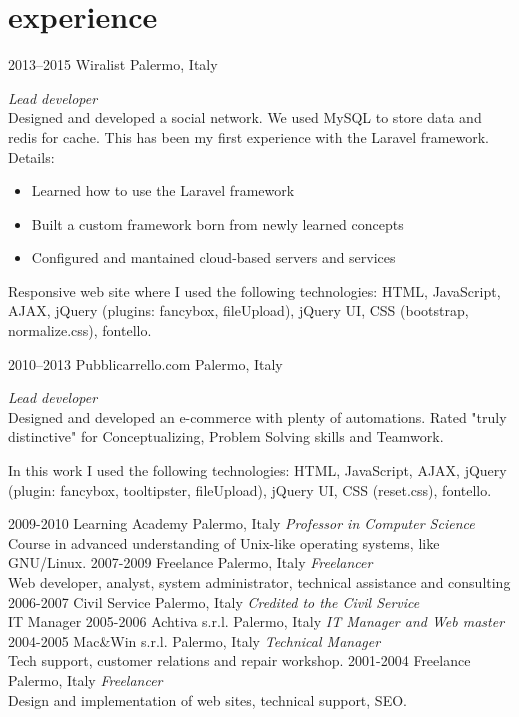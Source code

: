 \documentclass[]{friggeri-cv} %
\begin{document}
\section{experience}
\begin{entrylist}
\entry
{2013--2015}
{Wiralist}
{Palermo, Italy}
{\emph{Lead developer} \\
Designed and developed a social network. We used MySQL to store data and redis for cache. This has been my first experience with the Laravel framework. \\
Details:
\begin{itemize}
\item Learned how to use the Laravel framework
\item Built a custom framework born from newly learned concepts
\item Configured and mantained cloud-based servers and services
\end{itemize}

Responsive web site where I used the following technologies: HTML,
JavaScript, AJAX, jQuery (plugins: fancybox, fileUpload), jQuery UI,
CSS (bootstrap, normalize.css), fontello.
}
\entry
{2010--2013}
{Pubblicarrello.com}
{Palermo, Italy}
{\emph{Lead developer} \\
Designed and developed an e-commerce with plenty of automations. Rated "truly distinctive"
for Conceptualizing, Problem Solving skills and Teamwork.

In this work I used the following technologies: HTML,
JavaScript, AJAX, jQuery (plugin: fancybox, tooltipster, fileUpload),
jQuery UI, CSS (reset.css), fontello.
}
\entry
{2009-2010}
{Learning Academy}
{Palermo, Italy}
{\emph{Professor in Computer Science} \\
Course in advanced understanding of Unix-like operating systems, like GNU/Linux.
}
\entry
{2007-2009}
{Freelance}
{Palermo, Italy}
{\emph{Freelancer} \\
Web developer, analyst, system administrator, technical assistance and consulting
}
\entry
{2006-2007}
{Civil Service}
{Palermo, Italy}
{\emph{Credited to the Civil Service} \\
IT Manager
}
\entry
{2005-2006}
{Achtiva s.r.l.}
{Palermo, Italy}
{\emph{IT Manager and Web master}
}
\entry
{2004-2005}
{Mac\&Win s.r.l.}
{Palermo, Italy}
{\emph{Technical Manager} \\
Tech support, customer relations and repair workshop.
}
\entry
{2001-2004}
{Freelance}
{Palermo, Italy}
{\emph{Freelancer} \\
Design and implementation of web sites, technical support, SEO.
}
\end{entrylist}
\end{document}
